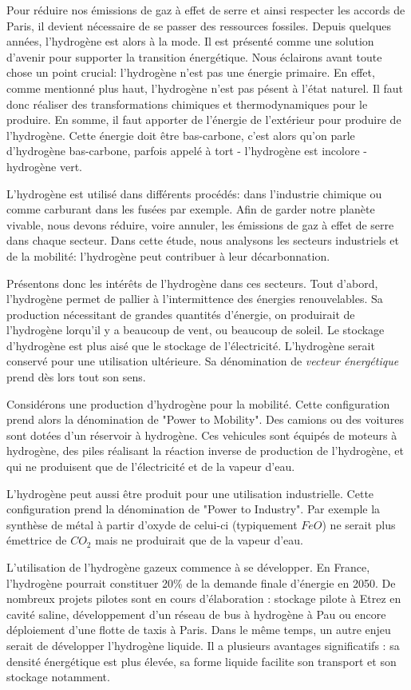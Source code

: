 \documentclass[11pt,french,a4paper]{article}
\begin{document}
Pour réduire nos émissions de gaz à effet de serre et ainsi respecter les accords de Paris, il devient nécessaire de se passer des ressources fossiles. Depuis quelques années, l'hydrogène est alors à la mode. Il est présenté comme une solution d'avenir pour supporter la transition énergétique. Nous éclairons avant toute chose un point crucial: l'hydrogène n'est pas une énergie primaire. En effet, comme mentionné plus haut, l'hydrogène n'est pas pésent à l'état naturel. Il faut donc réaliser des transformations chimiques et thermodynamiques pour le produire. En somme, il faut apporter de l'énergie de l'extérieur pour produire de l'hydrogène. Cette énergie doit être bas-carbone, c'est alors qu'on parle d'hydrogène bas-carbone, parfois appelé à tort - l'hydrogène est incolore - hydrogène vert.

L'hydrogène est utilisé dans différents procédés: dans l'industrie chimique ou comme carburant dans les fusées par exemple. Afin de garder notre planète vivable, nous devons réduire, voire annuler, les émissions de gaz à effet de serre dans chaque secteur. Dans cette étude, nous analysons les secteurs industriels et de la mobilité: l'hydrogène peut contribuer à leur décarbonnation.

Présentons donc les intérêts de l'hydrogène dans ces secteurs. Tout d'abord, l'hydrogène permet de pallier à l'intermittence des énergies renouvelables. Sa production nécessitant de grandes quantités d'énergie, on produirait de l'hydrogène lorqu'il y a beaucoup de vent, ou beaucoup de soleil. Le stockage d'hydrogène est plus aisé que le stockage de l'électricité. L'hydrogène serait conservé pour une utilisation ultérieure. Sa dénomination de \emph{vecteur énergétique} prend dès lors tout son sens.

Considérons une production d'hydrogène pour la mobilité. Cette configuration prend alors la dénomination de "Power to Mobility". Des camions ou des voitures sont dotées d'un réservoir à hydrogène. Ces vehicules sont équipés de moteurs à hydrogène, des piles réalisant la réaction inverse de production de l'hydrogène, et qui ne produisent que de l'électricité et de la vapeur d'eau. 
 
L'hydrogène peut aussi être produit pour une utilisation industrielle. Cette configuration prend la dénomination de "Power to Industry". Par exemple la synthèse de métal à partir d'oxyde de celui-ci (typiquement $FeO$) ne serait plus émettrice de $CO_2$ mais ne produirait que de la vapeur d'eau.
 
L’utilisation de l’hydrogène gazeux commence à se développer. En France, l’hydrogène pourrait constituer 20\% de la demande finale d’énergie en 2050. De nombreux projets pilotes sont en cours d’élaboration : stockage pilote à Etrez en cavité saline, développement d’un réseau de bus à hydrogène à Pau ou encore déploiement d’une flotte de taxis à Paris. Dans le même temps, un autre enjeu serait de développer l’hydrogène liquide. Il a plusieurs avantages significatifs : sa densité énergétique est plus élevée, sa forme liquide facilite son transport et son stockage notamment.
\end{document}
